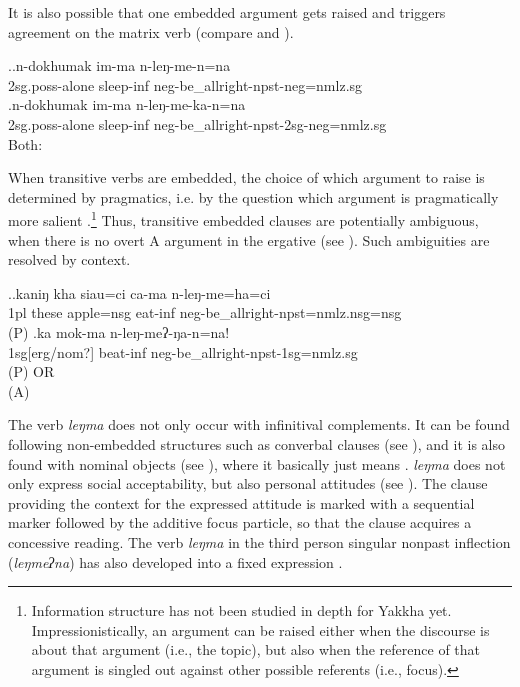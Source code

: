 It is also possible that one embedded argument gets raised and triggers agreement on the matrix verb (compare \Next[a] and \Next[b]). 

\ex.\ag.n-dokhumak im-ma n-leŋ-me-n=na\\
{\sc 2sg.poss-}alone sleep{\sc -inf} {\sc neg-}be\_allright{\sc [3sg]-npst-neg=nmlz.sg}\\
\bg.n-dokhumak im-ma n-leŋ-me-ka-n=na\\
{\sc 2sg.poss-}alone sleep{\sc -inf} {\sc neg-}be\_allright{\sc -npst-2sg-neg=nmlz.sg}\\
Both: 


When transitive verbs are embedded, the choice of which argument to raise is determined by pragmatics, i.e. by the question which argument is pragmatically more salient \Next.\footnote{Information structure has not been studied in depth for Yakkha yet. Impressionistically, an argument can be raised either when the discourse is about that argument (i.e., the topic), but also when the reference of that argument is singled out against other possible referents (i.e., focus).} Thus, transitive embedded clauses are potentially  ambiguous, when there is no overt A argument in the ergative (see \Next[b]). Such ambiguities are resolved by context.

\ex.\ag.kaniŋ kha siau=ci ca-ma n-leŋ-me=ha=ci\\
{\sc 1pl} these apple{\sc =nsg} eat{\sc -inf} {\sc neg-}be\_allright{\sc -npst=nmlz.nsg=nsg}\\
 (P)
\bg.ka mok-ma n-leŋ-meʔ-ŋa-n=na!\\
{\sc 1sg[erg/nom?]} beat{\sc -inf} {\sc neg-}be\_allright{\sc -npst-1sg=nmlz.sg}\\
 (P) OR\\
 (A)


The verb \emph{leŋma} does not only occur with infinitival complements. It can be found following non-embedded structures such as converbal clauses (see \Next[a]), and it is also found with nominal objects (see \Next[b]), where it basically just means . \emph{leŋma} does not only express social acceptability, but also personal attitudes (see \Next[c]). The clause providing the context for the expressed attitude is marked with a sequential marker followed by the additive focus particle, so that the clause acquires a concessive reading. The verb \emph{leŋma} in the third person singular nonpast inflection (\emph{leŋmeʔna}) has also developed into a fixed expression . 
	

